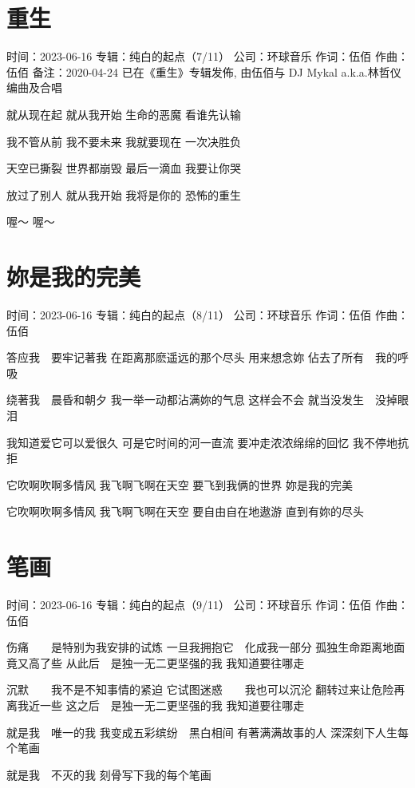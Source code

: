 \documentclass[UTF8,a4paper,oneside,twocolumn,12pt]{ctexbook}
\newcommand{\infopair}[2]{\textbullet #1：#2}
\newcommand{\zc}[1][伍佰]{\infopair{作词}{#1}}
\newcommand{\zq}[1][伍佰]{\infopair{作曲}{#1}}
\newcommand{\zj}[1]{\infopair{专辑}{#1}}
\newcommand{\sj}[1]{\infopair{时间}{#1}}
\newcommand{\bz}[1]{\infopair{备注}{#1}}
\newcommand{\gs}[1]{\infopair{公司}{#1}}
\newenvironment{info}{\begin{flushleft}\kaishu
	}
	{\end{flushleft}\normalsize\yahei\par}
\newenvironment{lyric}{
	}
{}
\begin{document}
\section{重生}
\begin{info}
	\sj{2023-06-16}
	\zj{纯白的起点（7/11）}
	\gs{环球音乐}
	\zc
	\zq
	\bz{2020-04-24 已在《重生》专辑发佈, 由伍佰与 DJ Mykal a.k.a.林哲仪编曲及合唱}
\end{info}
\begin{lyric}
	就从现在起 就从我开始
	生命的恶魔 看谁先认输

	我不管从前 我不要未来
	我就要现在 一次决胜负

	天空已撕裂 世界都崩毁
	最后一滴血 我要让你哭

	放过了别人 就从我开始
	我将是你的 恐怖的重生

	喔～
	喔～
\end{lyric}

\section{妳是我的完美}
\begin{info}
	\sj{2023-06-16}
	\zj{纯白的起点（8/11）}
	\gs{环球音乐}
	\zc
	\zq
\end{info}
\begin{lyric}
	答应我　要牢记著我
	在距离那麽遥远的那个尽头
	用来想念妳
	佔去了所有　我的呼吸

	绕著我　晨昏和朝夕
	我一举一动都沾满妳的气息
	这样会不会
	就当没发生　没掉眼泪

	我知道爱它可以爱很久
	可是它时间的河一直流
	要冲走浓浓绵绵的回忆
	我不停地抗拒

	它吹啊吹啊多情风
	我飞啊飞啊在天空
	要飞到我俩的世界
	妳是我的完美

	它吹啊吹啊多情风
	我飞啊飞啊在天空
	要自由自在地遨游
	直到有妳的尽头
\end{lyric}

\section{笔画}
\begin{info}
	\sj{2023-06-16}
	\zj{纯白的起点（9/11）}
	\gs{环球音乐}
	\zc
	\zq
\end{info}
\begin{lyric}
	伤痛　　是特别为我安排的试炼
	一旦我拥抱它　化成我一部分
	孤独生命距离地面竟又高了些
	从此后　是独一无二更坚强的我
	我知道要往哪走

	沉默　　我不是不知事情的紧迫
	它试图迷惑　　我也可以沉沦
	翻转过来让危险再离我近一些
	这之后　是独一无二更坚强的我
	我知道要往哪走

	就是我　唯一的我
	我变成五彩缤纷　黑白相间
	有著满满故事的人
	深深刻下人生每个笔画

	就是我　不灭的我
	刻骨写下我的每个笔画
\end{lyric}
\end{document}

